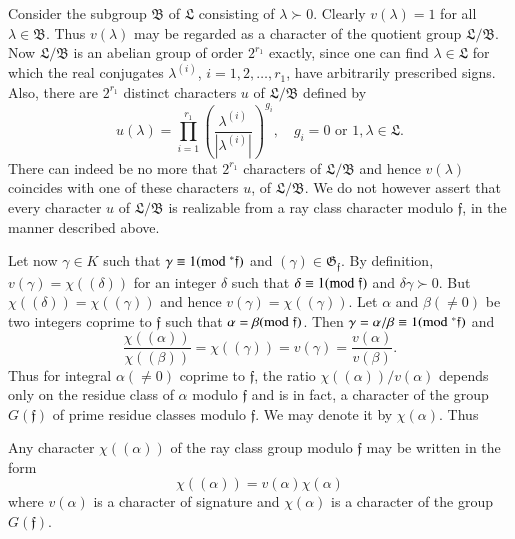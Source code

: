 Consider the subgroup $\mathfrak{B}$ of $\mathfrak{L}$ consisting of
$\lambda \succ 0$. Clearly $v(\lambda)=1$ for all $\lambda\in
\mathfrak{B}$. Thus $v(\lambda)$ may be regarded as a character of the
quotient group $\mathfrak{L}/\mathfrak{B}$. Now
$\mathfrak{L}/\mathfrak{B}$ is an abelian group of order $2^{r_{1}}$
exactly, since one can find $\lambda\in\mathfrak{L}$ for which the
real conjugates $\lambda^{(i)}$, $i=1,2,\ldots,r_{1}$, have
arbitrarily prescribed signs. Also, there are $2^{r_{1}}$ distinct
characters $u$ of $\mathfrak{L}/\mathfrak{B}$ defined by
$$
u(\lambda)=\prod^{r_{1}}_{i=1}\left(\frac{\lambda^{(i)}}{|\lambda^{(i)}|}\right)^{g_{i}},\quad
g_{i}=0\text{ \ or \ } 1,\lambda\in \mathfrak{L}.
$$
There can indeed be no more that $2^{r_{1}}$ characters of
$\mathfrak{L}/\mathfrak{B}$ and hence $v(\lambda)$ coincides with one
of these characters $u$, of $\mathfrak{L}/\mathfrak{B}$. We do not
however assert that every character $u$ of $\mathfrak{L}/\mathfrak{B}$
is realizable from a ray class character modulo $\mathfrak{f}$, in the
manner described above.

Let now $\gamma\in K$ such that $\gamma\equiv
1(\rm{mod} \;^{\ast}\mathfrak{f})$ and
$(\gamma)\in\mathfrak{G}_{\mathfrak{f}}$. By definition,
$v(\gamma)=\chi((\delta))$ for an integer $\delta$ such that
$\delta\equiv 1(\rm{mod} \; \mathfrak{f})$ and $\delta\gamma \succ 0$. But
$\chi((\delta))=\chi((\gamma))$ and hence
$v(\gamma)=\chi((\gamma))$. Let $\alpha$ and $\beta(\neq 0)$ be two
integers coprime to $\mathfrak{f}$ such that
$\alpha=\beta(\rm{mod} \;\mathfrak{f})$. Then $\gamma=\alpha/\beta\equiv
1(\rm{mod} \;^{\ast}\mathfrak{f})$ and
$$
\frac{\chi((\alpha))}{\chi((\beta))}=\chi((\gamma))=v(\gamma)=\frac{v(\alpha)}{v(\beta)}. 
$$
Thus for integral $\alpha(\neq 0)$ coprime to $\mathfrak{f}$, the
ratio $\chi((\alpha))/v(\alpha)$ depends only on the residue class of
$\alpha$ modulo $\mathfrak{f}$ and is in fact, a character of the
group $G(\mathfrak{f})$ of prime residue classes modulo
$\mathfrak{f}$. We may denote it by $\chi(\alpha)$. Thus

\begin{proposition}\label{prop14}
Any character $\chi((\alpha))$ of the ray class group modulo
$\mathfrak{f}$ may be written in the form
$$
\chi((\alpha))=v(\alpha)\chi(\alpha)
$$
where $v(\alpha)$ is a character of signature and $\chi(\alpha)$ is a
character of the group $G(\mathfrak{f})$.
\end{proposition}

